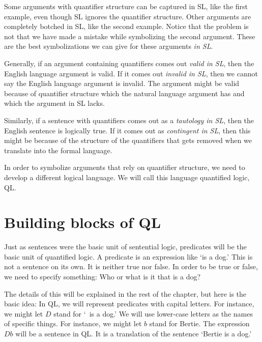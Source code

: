 Some arguments with quantifier structure can be captured in SL, like the first example, even though SL ignores the quantifier structure. Other arguments are completely botched in SL, like the second example. Notice that the problem is not that we have made a mistake while symbolizing the second argument. These are the best symbolizations we can give for these arguments \emph{in SL}.


Generally, if an argument containing quantifiers comes out \emph{valid in SL}, then the English language argument is valid. If it comes out \emph{invalid in SL}, then we cannot say the English language argument is invalid. The argument might be valid because of quantifier structure which the natural language argument has and which the argument in SL lacks.


Similarly, if a sentence with quantifiers comes out as a \emph{tautology in SL}, then the English sentence is logically true. If it comes out as \emph{contingent in SL}, then this might be because of the structure of the quantifiers that gets removed when we translate into the formal language.


In order to symbolize arguments that rely on quantifier structure, we need to develop a different logical language. We will call this language quantified logic, QL.


\section{Building blocks of QL}

Just as sentences were the basic unit of sentential logic, predicates will be the basic unit of quantified logic. A predicate is an expression like `is a dog.' This is not a sentence on its own. It is neither true nor false. In order to be true or false, we need to specify something: Who or what is it that is a dog?

The details of this will be explained in the rest of the chapter, but here is the basic idea: In QL, we will represent predicates with capital letters. For instance, we might let $D$ stand for `\blank\ is a dog.' We will use lower-case letters as the names of specific things. For instance, we might let $b$ stand for Bertie. The expression $Db$ will be a sentence in QL. It is a translation of the sentence `Bertie is a dog.'

